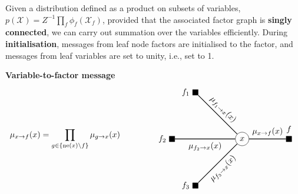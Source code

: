\documentclass{article}
\begin{document}
Given a distribution defined as a product on subsets of variables, $p(\mathcal{X}) = Z^{-1} \prod_f \phi_f(\mathcal{X}_f)$, provided that the associated factor graph is \textbf{singly connected}, we can carry out summation over the variables efficiently. During \textbf{initialisation}, messages from leaf node factors are initialised to the factor, and messages from leaf variables are set to unity, i.e., set to 1.
\\
\begin{theorem}
    \textbf{Variable-to-factor message} 
    \begin{equation*}
        \begin{aligned}
            \mu_{x \rightarrow f}(x) = \prod_{g \in \{\text{ne}(x)\text{\textbackslash}f\}} \mu_{g \rightarrow x}(x)
        \end{aligned}
        \qquad\qquad
        \vcenter{\hbox{
        \begin{tikzpicture}
            \node[circle, draw] at (0, 0)   (x) {$x$};
            \node[rectangle, draw, fill=black, label=left:{$f_1$}] at (-2, 2)   (f1) {};
            \node[rectangle, draw, fill=black, label=left:{$f_2$}] at (-3, 0)   (f2) {};
            \node[rectangle, draw, fill=black, label=left:{$f_3$}] at (-2, -2)   (f3) {};

            \node[rectangle, draw, fill=black, label=above:{$f$}] at (2, 0)   (f) {};
            
            \draw [thick] (f1) -- (x) node [midway,sloped, above, draw=none] {$\mu_{f_1 \rightarrow x}(x)$};
            \draw [thick] (f2) -- (x) node [midway,sloped, below, draw=none] {$\mu_{f_2 \rightarrow x}(x)$};
            \draw [thick] (f3) -- (x) node [midway,sloped, below, draw=none] {$\mu_{f_3 \rightarrow x}(x)$};
            \draw [thick] (x) -- (f) node [midway,sloped, above, draw=none] {$\mu_{x \rightarrow f}(x)$};
        \end{tikzpicture}
        }}
    \end{equation*}
\end{theorem}
\end{document}
